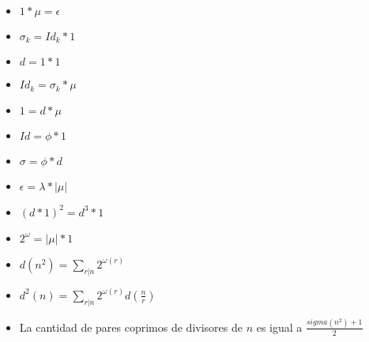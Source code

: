 {\normalsize
    \begin{itemize}
        \item $1*\mu = \epsilon$
        \item $\sigma_k = Id_k*1$
        \item $d = 1 * 1$
        \item $Id_k = \sigma_k * \mu$
        \item $1 = d * \mu$
        \item $Id = \phi * 1$
        \item $\sigma = \phi * d$
        \item $\epsilon = \lambda*|\mu|$
        \item $(d*1)^2 = d^3*1$
        \item $2^\omega = |\mu|*1$
        \item $\displaystyle d(n^2) = \sum_{r|n} 2^{\omega(r)}$ 
        \item $\displaystyle d^2(n) = \sum_{r|n} 2^{\omega(r)}d(\frac{n}{r})$ 
        \item La cantidad de pares coprimos de divisores de $n$ es igual a $\frac{sigma(n^2)+1}{2}$
    \end{itemize} 
}
